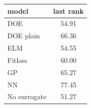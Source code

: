 \begin{tabular}{|lc|}
\hline
model & last rank\\
\hline
DOE & 54.91 \\
DOE plain & 66.36 \\
ELM & 54.55 \\
Fitloss & 60.00 \\
GP & 65.27 \\
NN & 77.45 \\
No surrogate & 51.27 \\
\hline
\end{tabular}
